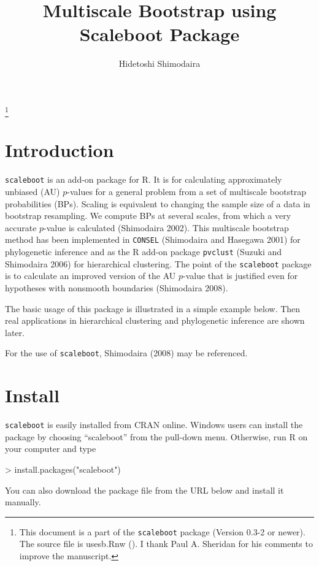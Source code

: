 \documentclass[a4paper]{amsart}
\begin{document}
\title{Multiscale Bootstrap using Scaleboot Package}
\author{Hidetoshi Shimodaira}
\thanks{This document is a part of the {\tt scaleboot} package (Version 0.3-2 or newer). The source file is usesb.Rnw (\documentid).
I thank Paul A. Sheridan for his comments to improve the manuscript.}
\address{Department of Mathematical and Computing Sciences\\
Tokyo Institute of Technology\\
2-12-1 Ookayama, Meguro-ku, Tokyo 152-8552, Japan}


\maketitle

\section{Introduction}

{\tt scaleboot} is an add-on package for R. It is for calculating
approximately unbiased (AU) $p$-values for a general problem from a set
of multiscale bootstrap probabilities (BPs). Scaling is equivalent to
changing the sample size of a data in bootstrap resampling. We
compute BPs at several scales, from which a very accurate $p$-value is
calculated (Shimodaira 2002). This multiscale bootstrap method has
been implemented in {\tt CONSEL} (Shimodaira and Hasegawa 2001) for
phylogenetic inference and as the R add-on package {\tt pvclust}
(Suzuki and Shimodaira 2006) for hierarchical clustering. The point of
the {\tt scaleboot} package is to calculate an improved version of the
AU $p$-value that is justified even for hypotheses with nonsmooth
boundaries (Shimodaira 2008).

The basic usage of this package is illustrated in a simple example
below.  Then real applications in hierarchical clustering and
phylogenetic inference are shown later.

For the use of {\tt scaleboot}, Shimodaira (2008) may be referenced.

\section{Install}

{\tt scaleboot} is easily installed from CRAN online.  Windows users
can install the package by choosing ``scaleboot'' from the pull-down
menu.  Otherwise, run R on your computer and type
\begin{Schunk}
\begin{Sinput}
> install.packages("scaleboot")
\end{Sinput}
\end{Schunk}
You can also download the package file from the URL below and
install it manually.
\end{document}
